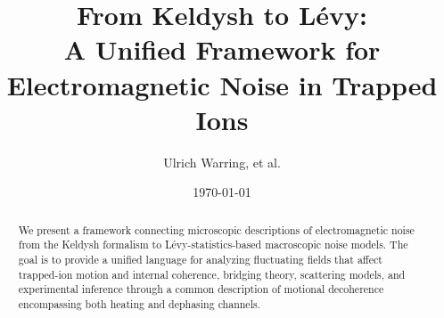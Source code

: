 \documentclass[11pt,a4paper]{article}
\title{From Keldysh to L\'evy:\\
  A Unified Framework for Electromagnetic Noise in Trapped Ions}
\author[1]{Ulrich Warring, et al.}
\affil[1]{Physikalisches Institut, Universität Freiburg, Germany}
\date{\today}
\begin{document}
\maketitle

\begin{abstract}
We present a framework connecting microscopic descriptions of electromagnetic noise
from the Keldysh formalism to L\'evy-statistics-based macroscopic noise models.
The goal is to provide a unified language for analyzing fluctuating fields
that affect trapped-ion motion and internal coherence,
bridging theory, scattering models, and experimental inference through a
common description of motional decoherence encompassing both heating and
dephasing channels.
\end{abstract}















\end{document}
